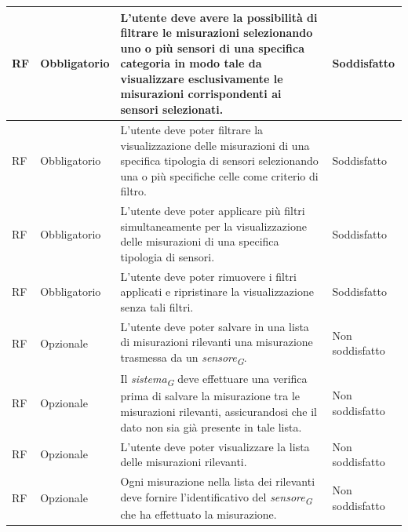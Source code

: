 \begin{longtable}{|C{1.5cm}|C{2cm}|L{5cm}|C{2cm}|}
    \hline
     RF & Obbligatorio & L'utente deve avere la possibilità di filtrare le misurazioni selezionando uno o più sensori di una specifica categoria in modo tale da visualizzare esclusivamente le misurazioni corrispondenti ai sensori selezionati.& Soddisfatto \\
    
    \hline
     RF & Obbligatorio & L'utente deve poter filtrare la visualizzazione delle misurazioni di una specifica tipologia di sensori selezionando una o più specifiche celle come criterio di filtro.& Soddisfatto \\
    
    \hline
     RF & Obbligatorio & L'utente deve poter applicare più filtri simultaneamente per la visualizzazione delle misurazioni di una specifica tipologia di sensori.& Soddisfatto \\
    
    \hline
     RF & Obbligatorio & L'utente deve poter rimuovere i filtri applicati e ripristinare la visualizzazione senza tali filtri.& Soddisfatto \\

    \hline
     RF & Opzionale & L'utente deve poter salvare in una lista di misurazioni rilevanti una misurazione trasmessa da un \textit{sensore}\textsubscript{\textit{G}}.& Non soddisfatto \\
    
    \hline
     RF & Opzionale & Il \textit{sistema}\textsubscript{\textit{G}} deve effettuare una verifica prima di salvare la misurazione tra le misurazioni rilevanti, assicurandosi che il dato non sia già presente in tale lista.& Non soddisfatto \\
    
    \hline
     RF & Opzionale & L'utente deve poter visualizzare la lista delle misurazioni rilevanti.& Non soddisfatto \\
    
    \hline
     RF & Opzionale & Ogni misurazione nella lista dei rilevanti deve fornire l'identificativo del \textit{sensore}\textsubscript{\textit{G}} che ha effettuato la misurazione.& Non soddisfatto \\


\end{longtable}
